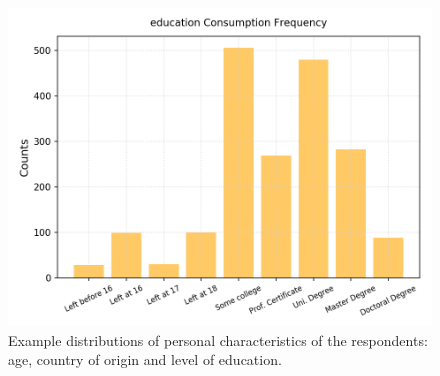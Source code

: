 \documentclass{article}
\begin{document}
\begin{figure}[h!]
\begin{minipage}[b]{0.32\textwidth}
	\end{minipage}
	\begin{minipage}[b]{0.32\textwidth}
		\includegraphics[width=\textwidth]{plots/drugsPlots/education_freq.png}
	\end{minipage}
	\caption{Example distributions of personal characteristics of the respondents: age, country of origin and level of education.}
	\label{drugs2}
\end{figure}
\end{document}
